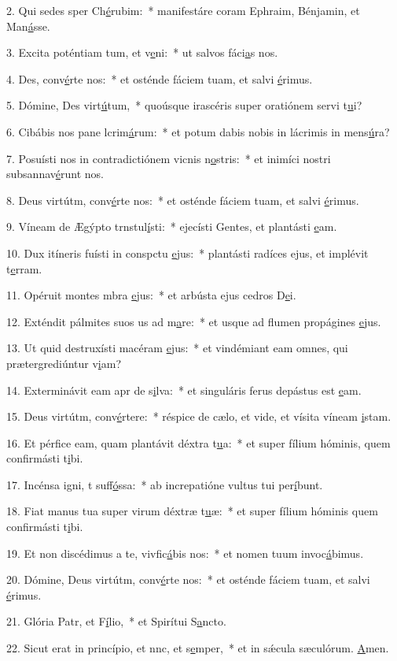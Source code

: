 2. Qui sedes sper Ch\uline{é}rubim:~* manifestáre coram Ephraim, Bénjamin, et Man\uline{á}sse.\par 
3. Excita poténtiam tum, et v\uline{e}ni:~* ut salvos fáci\uline{a}s nos.\par 
4. Des, conv\uline{é}rte nos:~* et osténde fáciem tuam, et salvi \uline{é}rimus.\par 
5. Dómine, Des virt\uline{ú}tum,~* quoúsque irascéris super oratiónem servi t\uline{u}i?\par 
6. Cibábis nos pane lcrim\uline{á}rum:~* et potum dabis nobis in lácrimis in mens\uline{ú}ra?\par 
7. Posuísti nos in contradictiónem vicnis n\uline{o}stris:~* et inimíci nostri subsannav\uline{é}runt nos.\par 
8. Deus virtútm, conv\uline{é}rte nos:~* et osténde fáciem tuam, et salvi \uline{é}rimus.\par 
9. Víneam de Ægýpto trnstul\uline{í}sti:~* ejecísti Gentes, et plantásti \uline{e}am.\par 
10. Dux itíneris fuísti in conspctu \uline{e}jus:~* plantásti radíces ejus, et implévit t\uline{e}rram.\par 
11. Opéruit montes mbra \uline{e}jus:~* et arbústa ejus cedros D\uline{e}i.\par 
12. Exténdit pálmites suos us ad m\uline{a}re:~* et usque ad flumen propágines \uline{e}jus.\par 
13. Ut quid destruxísti macéram \uline{e}jus:~* et vindémiant eam omnes, qui prætergrediúntur v\uline{i}am?\par 
14. Exterminávit eam apr de s\uline{i}lva:~* et singuláris ferus depástus est \uline{e}am.\par 
15. Deus virtútm, conv\uline{é}rtere:~* réspice de cælo, et vide, et vísita víneam \uline{i}stam.\par 
16. Et pérfice eam, quam plantávit déxtra t\uline{u}a:~* et super fílium hóminis, quem confirmásti t\uline{i}bi.\par 
17. Incénsa igni, t suff\uline{ó}ssa:~* ab increpatióne vultus tui per\uline{í}bunt.\par 
18. Fiat manus tua super virum déxtræ t\uline{u}æ:~* et super fílium hóminis quem confirmásti t\uline{i}bi.\par 
19. Et non discédimus a te, vivfic\uline{á}bis nos:~* et nomen tuum invoc\uline{á}bimus.\par 
20. Dómine, Deus virtútm, conv\uline{é}rte nos:~* et osténde fáciem tuam, et salvi \uline{é}rimus.\par 
21. Glória Patr, et F\uline{í}lio,~* et Spirítui S\uline{a}ncto.\par 
22. Sicut erat in princípio, et nnc, et s\uline{e}mper,~* et in sǽcula sæculórum. \uline{A}men.\par 

